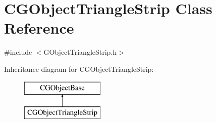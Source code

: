 \hypertarget{class_c_g_object_triangle_strip}{}\section{C\+G\+Object\+Triangle\+Strip Class Reference}
\label{class_c_g_object_triangle_strip}


{\ttfamily \#include $<$G\+Object\+Triangle\+Strip.\+h$>$}

Inheritance diagram for C\+G\+Object\+Triangle\+Strip\+:\begin{figure}[H]
\begin{center}
\leavevmode
\includegraphics[height=2.000000cm]{class_c_g_object_triangle_strip}
\end{center}
\end{figure}
